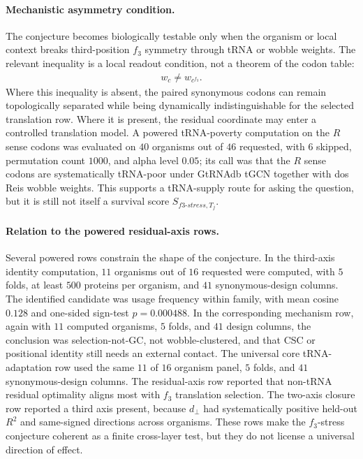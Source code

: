 \paragraph{Mechanistic asymmetry condition.}
The conjecture becomes biologically testable only when the organism or local context breaks third-position $f_3$ symmetry through tRNA or wobble weights.  The relevant inequality is a local readout condition, not a theorem of the codon table:
$$
\begin{aligned}
w_c \neq w_{c^{f_3}}.
\end{aligned}
$$
Where this inequality is absent, the paired synonymous codons can remain topologically separated while being dynamically indistinguishable for the selected translation row.  Where it is present, the residual coordinate may enter a controlled translation model.  A powered tRNA-poverty computation on the $R$ sense codons was evaluated on $40$ organisms out of $46$ requested, with $6$ skipped, permutation count $1000$, and alpha level $0.05$; its call was that the $R$ sense codons are systematically tRNA-poor under GtRNAdb tGCN together with dos Reis wobble weights.  This supports a tRNA-supply route for asking the question, but it is still not itself a survival score $S_{f3\text{-}stress,T_j}$.

\paragraph{Relation to the powered residual-axis rows.}
Several powered rows constrain the shape of the conjecture.  In the third-axis identity computation, $11$ organisms out of $16$ requested were computed, with $5$ folds, at least $500$ proteins per organism, and $41$ synonymous-design columns.  The identified candidate was usage frequency within family, with mean cosine $0.128$ and one-sided sign-test $p=0.000488$.  In the corresponding mechanism row, again with $11$ computed organisms, $5$ folds, and $41$ design columns, the conclusion was selection-not-GC, not wobble-clustered, and that CSC or positional identity still needs an external contact.  The universal core tRNA-adaptation row used the same $11$ of $16$ organism panel, $5$ folds, and $41$ synonymous-design columns.  The residual-axis row reported that non-tRNA residual optimality aligns most with $f_3$ translation selection.  The two-axis closure row reported a third axis present, because $d_\perp$ had systematically positive held-out $R^2$ and same-signed directions across organisms.  These rows make the $f_3$-stress conjecture coherent as a finite cross-layer test, but they do not license a universal direction of effect.

